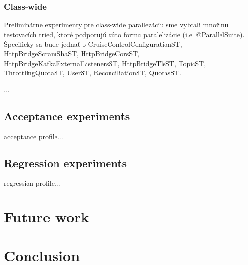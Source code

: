 \subsection{Class-wide}

Preliminárne experimenty pre class-wide parallezáciu sme vybrali množinu testovacích tried, ktoré podporujú túto formu
paralelizácie (i.e, @ParallelSuite).
Špecificky sa bude jednať o CruiseControlConfigurationST, HttpBridgeScramShaST, HttpBridgeCorsST, HttpBridgeKafkaExternalListenersST,
HttpBridgeTlsST, TopicST, ThrottlingQuotaST, UserST, ReconciliationST, QuotasST.

...



\section{Acceptance experiments}

acceptance profile...

\section{Regression experiments}

regression profile...

\chapter{Future work}
\label{07:chapter:title}

\chapter{Conclusion}
\label{08:chapter:title}
